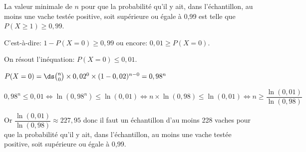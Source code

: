 \begin{enumerate}
La valeur minimale de $n$ pour que la probabilité qu'il y ait, dans l'échantillon, au moins une vache testée positive, soit supérieure ou égale à 0,99 est telle que
$P(X\geqslant 1) \geqslant 0,99$.

C'est-à-dire:
$1-P(X=0) \geqslant 0,99$
ou encore:
$0,01\geqslant P(X=0)$.

On résout l'inéquation: $P(X=0)\leqslant 0,01$.

$P(X=0) = \ds\binom{n}{0}\times 0,02^{0}\times (1-0,02)^{n-0}=0,98^n$

$0,98^n \leqslant 0,01
\iff
\ln\left (0,98^n\right ) \leqslant \ln(0,01)
\iff
n\times \ln (0,98 ) \leqslant \ln(0,01)
\iff
n \geqslant \dfrac{\ln(0,01)}{\ln(0,98)}$

Or $\dfrac{\ln(0,01)}{\ln(0,98)} \approx 227,95$
donc il faut un échantillon d'au moins 228 vaches pour que la probabilité qu'il y ait, dans l'échantillon, au moins une vache testée positive, soit supérieure ou égale à 0,99.

\end{enumerate}

\vspace{1cm}


